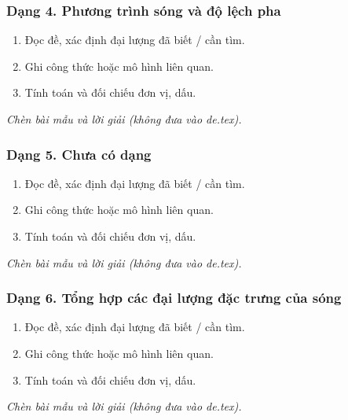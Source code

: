 \subsubsection{Dạng 4. Phương trình sóng và độ lệch pha}
\begin{phuongphap}
\begin{enumerate}
\item Đọc đề, xác định đại lượng đã biết / cần tìm.
\item Ghi công thức hoặc mô hình liên quan.
\item Tính toán và đối chiếu đơn vị, dấu.
\end{enumerate}
\end{phuongphap}
\begin{vidumau}
\textit{Chèn bài mẫu và lời giải (không đưa vào de.tex).}
\end{vidumau}

\subsubsection{Dạng 5. Chưa có dạng}
\begin{phuongphap}
\begin{enumerate}
\item Đọc đề, xác định đại lượng đã biết / cần tìm.
\item Ghi công thức hoặc mô hình liên quan.
\item Tính toán và đối chiếu đơn vị, dấu.
\end{enumerate}
\end{phuongphap}
\begin{vidumau}
\textit{Chèn bài mẫu và lời giải (không đưa vào de.tex).}
\end{vidumau}

\subsubsection{Dạng 6. Tổng hợp các đại lượng đặc trưng của sóng}
\begin{phuongphap}
\begin{enumerate}
\item Đọc đề, xác định đại lượng đã biết / cần tìm.
\item Ghi công thức hoặc mô hình liên quan.
\item Tính toán và đối chiếu đơn vị, dấu.
\end{enumerate}
\end{phuongphap}
\begin{vidumau}
\textit{Chèn bài mẫu và lời giải (không đưa vào de.tex).}
\end{vidumau}

